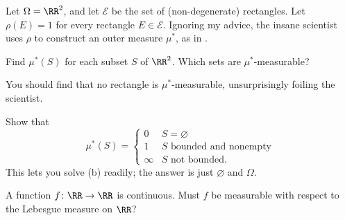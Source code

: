 \begin{problem}
	Let $\Omega = \RR^2$, and let $\mathcal{E}$
	be the set of (non-degenerate) rectangles.
	Let $\rho(E) = 1$ for every rectangle $E \in \mathcal{E}$.
	Ignoring my advice, the insane scientist
	uses $\rho$ to construct an outer measure $\mu^\ast$,
	as in .
	\begin{enumerate}[(a)]
		\ii Find $\mu^\ast(S)$ for each subset $S$ of $\RR^2$.
		\ii Which sets are $\mu^\ast$-measurable?
	\end{enumerate}
	You should find that no rectangle is $\mu^\ast$-measurable,
	unsurprisingly foiling the scientist.
	\begin{hint}
		Show that
		\[ \mu^\ast(S) = \begin{cases}
				0 & S = \varnothing \\
				1 & S \text{ bounded and nonempty} \\
				\infty & S \text{ not bounded}.
			\end{cases}
		\]
		This lets you solve (b) readily;
		the answer is just $\varnothing$ and $\Omega$.
	\end{hint}
\end{problem}

\begin{problem}
	\onechili
	A function $f \colon \RR \to \RR$ is continuous.
	Must $f$ be measurable with respect to the Lebesgue measure on $\RR$?
\end{problem}
